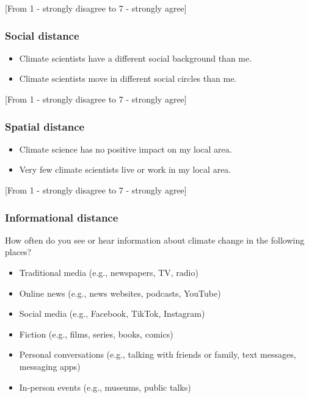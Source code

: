 \documentclass[
  letterpaper,
  DIV=11,
  numbers=noendperiod]{scrartcl}
\providecommand{\tightlist}{%
  \setlength{\itemsep}{0pt}\setlength{\parskip}{0pt}}
\begin{document}
{[}From 1 - strongly disagree to 7 - strongly agree{]}

\subsubsection{Social distance}\label{social-distance}

\begin{itemize}
\tightlist
\item
  Climate scientists have a different social background than me.
\item
  Climate scientists move in different social circles than me.
\end{itemize}

{[}From 1 - strongly disagree to 7 - strongly agree{]}

\subsubsection{Spatial distance}\label{spatial-distance}

\begin{itemize}
\tightlist
\item
  Climate science has no positive impact on my local area.
\item
  Very few climate scientists live or work in my local area.
\end{itemize}

{[}From 1 - strongly disagree to 7 - strongly agree{]}

\subsubsection{Informational distance}\label{informational-distance}

How often do you see or hear information about climate change in the
following places?

\begin{itemize}
\tightlist
\item
  Traditional media (e.g., newspapers, TV, radio)
\item
  Online news (e.g., news websites, podcasts, YouTube)
\item
  Social media (e.g., Facebook, TikTok, Instagram)
\item
  Fiction (e.g., films, series, books, comics)
\item
  Personal conversations (e.g., talking with friends or family, text
  messages, messaging apps)
\item
  In-person events (e.g., museums, public talks)
\end{itemize}
\end{document}
